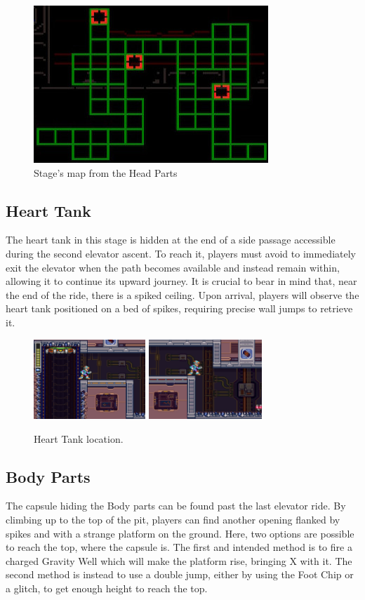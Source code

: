 \begin{figure}[htp]
	\centering
	\includegraphics[width=.5\linewidth]{figures/X3/Volt_catfish/map.jpg}
	\caption{Stage's map from the Head Parts}
	\label{fig:Power_control_map}
\end{figure}

\subsection{Heart Tank}
The heart tank in this stage is hidden at the end of a side passage accessible during the second elevator ascent. To reach it, players must avoid to immediately exit the elevator when the path becomes available and instead remain within, allowing it to continue its upward journey. It is crucial to bear in mind that, near the end of the ride, there is a spiked ceiling. Upon arrival, players will observe the heart tank positioned on a bed of spikes, requiring precise wall jumps to retrieve it.

\begin{figure}[htp]
	\centering
	\includegraphics[height=3cm]{figures/X3/Volt_catfish/heart_1.jpg}
	\includegraphics[height=3cm]{figures/X3/Volt_catfish/heart_2.jpg}
	\caption{Heart Tank location.}
\end{figure}

\subsection{Body Parts}
The capsule hiding the Body parts can be found past the last elevator ride. By climbing up to the top of the pit, players can find another opening flanked by spikes and with a strange platform on the ground. Here, two options are possible to reach the top, where the capsule is. The first and intended method is to fire a charged Gravity Well  which will make the platform rise, bringing X with it. The second method is instead to use a double jump, either by using the Foot Chip or a glitch, to get enough height to reach the top. 

